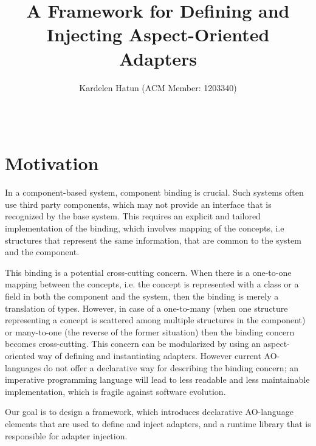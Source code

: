 \documentclass{acm_proc_article-sp}
\begin{document}
\title{A Framework for Defining and Injecting Aspect-Oriented Adapters}


%
\author{
\alignauthor
Kardelen Hatun (ACM Member: 1203340)\\
       \\
       \\
}


\maketitle


\section{Motivation}
In a component-based system, component binding is crucial. Such systems often use third party components, which may not provide an interface that is recognized by the base system. This requires an explicit and tailored implementation of the binding, which involves mapping of the concepts, i.e structures that represent the same information, that are common to the system and the component.  

This binding is a potential cross-cutting concern. When there is a one-to-one mapping between the concepts, i.e. the concept is represented with a class or a field in both the component and the system, then the binding is merely a translation of types. However, in case of a one-to-many (when one structure representing a concept is scattered among multiple structures in the component) or many-to-one (the reverse of the former situation) then the binding concern becomes cross-cutting. This concern can be modularized by using an aspect-oriented way of defining and instantiating adapters. However current AO-languages do not offer a declarative way for describing the binding concern; an imperative programming language will lead to less readable and less maintainable implementation, which is fragile against software evolution.

Our goal is to design a framework, which introduces declarative AO-language elements that are used to define and inject adapters, and a runtime library that is responsible for adapter injection.
\end{document}
